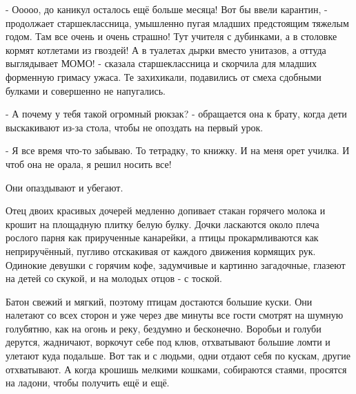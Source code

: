 - Ооооо, до каникул осталось ещё больше месяца! Вот бы ввели карантин, -
продолжает старшеклассница, умышленно пугая младших предстоящим тяжелым годом.
Там все очень и очень страшно! Тут учителя с дубинками, а в столовке кормят
котлетами из гвоздей! А в туалетах дырки вместо унитазов, а оттуда выглядывает
МОМО! - сказала старшеклассница и скорчила для младших форменную гримасу ужаса.
Те захихикали, подавились от смеха сдобными булками и совершенно не напугались.

- А почему у тебя такой огромный рюкзак? - обращается она к брату, когда дети
выскакивают из-за стола, чтобы не опоздать на первый урок. 

- Я все время что-то забываю. То тетрадку, то книжку. И на меня орет училка. И
чтоб она не орала, я решил носить все! 

Они опаздывают и убегают.

Отец двоих красивых дочерей медленно допивает стакан горячего молока и крошит
на площадную плитку белую булку. Дочки ласкаются около плеча рослого парня как
прирученные канарейки, а птицы прокармливаются как неприручённый, пугливо
отскакивая от каждого движения кормящих рук. Одинокие девушки с горячим кофе,
задумчивые и картинно загадочные, глазеют на детей со скукой, и на молодых
отцов - с тоской. 

Батон свежий и мягкий, поэтому птицам достаются большие куски. Они налетают со
всех сторон и уже через две минуты все гости смотрят на шумную голубятню, как
на огонь и реку, бездумно и бесконечно. Воробьи и голуби дерутся, жадничают,
воркочут себе под клюв, отхватывают большие ломти и улетают куда подальше. Вот
так и с людьми, одни отдают себя по кускам, другие отхватывают. А когда крошишь
мелкими кошками, собираются стаями, просятся на ладони, чтобы получить ещё и
ещё.



